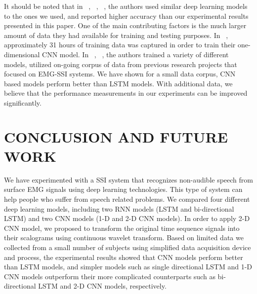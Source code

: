 \documentclass{article}
\begin{document}

It should be noted that in  ~\cite{janke_emg--speech:_2017}, ~\cite{kapur_alterego:_2018}, ~\cite{diener_session-independent_nodate}, the authors used similar deep learning models to the ones we used, and reported higher accuracy than our experimental results presented in this paper. One of the main contributing factors is the much larger amount of data they had available for training and testing purposes. In ~\cite{kapur_alterego:_2018}, approximately 31 hours of training data was captured in order to train their one-dimensional CNN model. In ~\cite{janke_emg--speech:_2017}, ~\cite{diener_session-independent_nodate}, the authors trained a variety of different models, utilized on-going corpus of data from previous research projects that focused on EMG-SSI systems. We have shown for a small data corpus, CNN based models perform better than LSTM models. With additional data, we believe that the performance measurements in our experiments can be improved significantly. 


\section{CONCLUSION AND FUTURE WORK}
\label{sec:CONCLUSION}

We have experimented with a SSI system that recognizes non-audible speech from surface EMG signals using deep learning technologies.  This type of system can help  people who suffer from speech related problems. We compared four different deep learning models, including two RNN models (LSTM and bi-directional LSTM) and two CNN models (1-D and 2-D CNN models). In order to apply 2-D CNN model, we proposed to transform the original time sequence signals into their scalograms using continuous wavelet transform. Based on limited data we collected from a small number of subjects using simplified data acquisition device and process, the experimental results showed that CNN models perform better than LSTM models, and  simpler models such as single directional LSTM and 1-D CNN models outperform their more complicated counterparts such as bi-directional LSTM and 2-D CNN models, respectively.  
\end{document}
